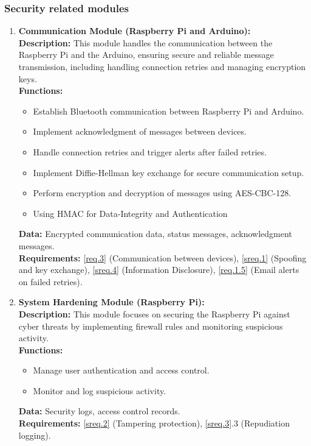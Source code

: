 \subsubsection{Security related modules}
\begin{enumerate}
    \item \textbf{Communication Module (Raspberry Pi and Arduino):} \\ 
        \textbf{Description:} This module handles the communication between the Raspberry Pi and the Arduino, ensuring secure and reliable message transmission, including handling connection retries and managing encryption keys. \\ 
        \textbf{Functions:}
        \begin{itemize}
            \item Establish Bluetooth communication between Raspberry Pi and Arduino.
            \item Implement acknowledgment of messages between devices.
            \item Handle connection retries and trigger alerts after failed retries.
            \item Implement Diffie-Hellman key exchange for secure communication setup.
            \item Perform encryption and decryption of messages using AES-CBC-128.
            \item Using HMAC for Data-Integrity and Authentication
        \end{itemize}
        \textbf{Data:} Encrypted communication data, status messages, acknowledgment messages. \\ 
        \textbf{Requirements:} \ref{req.3} (Communication between devices), \ref{sreq.1} (Spoofing and key exchange), \ref{sreq.4} (Information Disclosure), \ref{req.1.5} (Email alerts on failed retries).

    \item \textbf{System Hardening Module (Raspberry Pi):} \\ 
        \textbf{Description:} This module focuses on securing the Raspberry Pi against cyber threats by implementing firewall rules and monitoring suspicious activity. \\ 
        \textbf{Functions:}
        \begin{itemize}
            \item Manage user authentication and access control.
            \item Monitor and log suspicious activity.
        \end{itemize}
        \textbf{Data:} Security logs, access control records. \\ 
        \textbf{Requirements:} \ref{sreq.2} (Tampering protection), \ref{sreq.3}.3 (Repudiation logging).
\end{enumerate}

